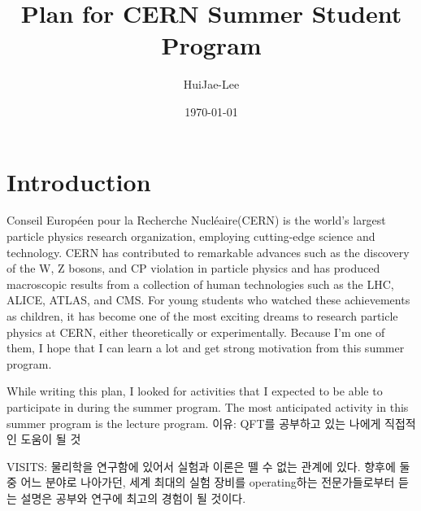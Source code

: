 \documentclass[aps,superscriptaddress,11pt]{revtex4-2}
\begin{document}
\title{Plan for CERN Summer Student Program}

\author{HuiJae-Lee}


\date{\today}

 \maketitle
 
\section{Introduction}
Conseil Européen pour la Recherche Nucléaire(CERN) is the world's largest particle 
physics research organization, employing cutting-edge science and technology. 
CERN has contributed to remarkable advances such as the discovery of the W, Z bosons, 
and CP violation in particle physics and has produced macroscopic results from a 
collection of human technologies such as the LHC, ALICE, ATLAS, and CMS. For young 
students who watched these achievements as children, it has become one of the most 
exciting dreams to research particle physics at CERN, either theoretically or 
experimentally. Because I'm one of them, I hope that I can learn a lot and get 
strong motivation from this summer program.


While writing this plan, I looked for activities that 
I expected to be able to participate in during the summer program.
The most anticipated activity in this summer program is the 
lecture program. 이유: QFT를 공부하고 있는 나에게 직접적인 도움이 될 것

VISITS: 물리학을 연구함에 있어서 실험과 이론은 뗄 수 없는 관계에 있다. 
향후에 둘 중 어느 분야로 나아가던, 세계 최대의 실험 장비를 operating하는 
전문가들로부터 듣는 설명은 공부와 연구에 최고의 경험이 될 것이다.



\vfill
\end{document}
